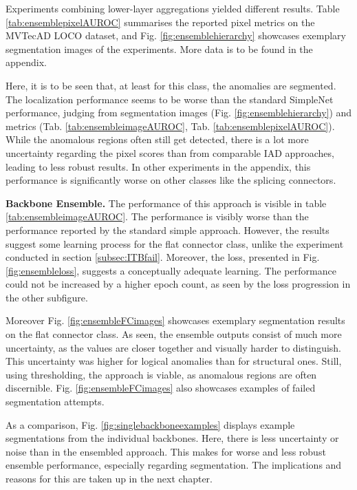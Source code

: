 


Experiments combining lower-layer aggregations yielded different results. Table \ref{tab:ensemblepixelAUROC} summarises the reported pixel metrics on the MVTecAD LOCO \cite{LOCODentsAndScratchesBergmann2022} 
dataset, and Fig. \ref{fig:ensemblehierarchy} showcases exemplary 
segmentation images of the experiments. More data is to be found in the appendix.



Here, it is to be seen that, at least for this class, the anomalies are segmented. The localization performance seems to be worse than the standard SimpleNet \cite{liu2023simplenet} 
performance, judging from segmentation images (Fig. \ref{fig:ensemblehierarchy}) and metrics (Tab. \ref{tab:ensembleimageAUROC}, Tab. \ref{tab:ensemblepixelAUROC}). While the anomalous regions often still get detected, there is a lot more uncertainty regarding 
the pixel scores than from comparable IAD approaches, leading to less robust results. In other experiments in the appendix, this performance is significantly worse on 
other classes like the splicing connectors.



\textbf{Backbone Ensemble.} The performance of this approach is visible in table \ref{tab:ensembleimageAUROC}. The performance is visibly worse than the performance 
reported by the standard simple approach. However, the results suggest some learning process for the flat connector class, unlike the experiment conducted in section \ref{subsec:ITBfail}. 
Moreover, the loss, presented in Fig. \ref{fig:ensembleloss}, suggests a conceptually adequate learning. The performance could not be increased by a higher 
epoch count, as seen by the loss progression in the other subfigure.



Moreover Fig. \ref{fig:ensembleFCimages} showcases exemplary segmentation results on the flat connector class. As 
seen, the ensemble outputs consist of much more uncertainty, as the values are closer together and visually harder to distinguish. This uncertainty 
was higher for logical anomalies than for structural ones. Still, 
using thresholding, the approach is viable, as anomalous regions are often discernible. Fig. \ref{fig:ensembleFCimages} also showcases examples of failed segmentation 
attempts. 



As a comparison, Fig. \ref{fig:singlebackboneexamples} displays example segmentations from the individual backbones. Here, there is less uncertainty or 
noise than in the ensembled approach. This makes for worse and less robust ensemble performance, especially regarding segmentation. 
The implications and reasons for this are taken up in the next chapter.






